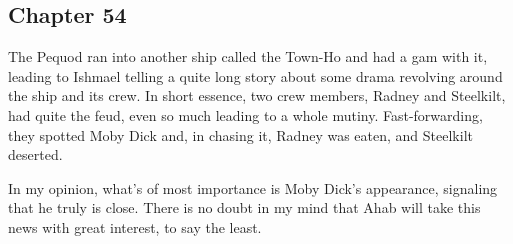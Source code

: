 \subsection{Chapter 54}

The Pequod ran into another ship called the Town-Ho and had a gam with it,
leading to Ishmael telling a quite long story about some drama revolving around
the ship and its crew. In short essence, two crew members, Radney and
Steelkilt, had quite the feud, even so much leading to a whole mutiny.
Fast-forwarding, they spotted Moby Dick and, in chasing it, Radney was eaten,
and Steelkilt deserted.

In my opinion, what's of most importance is Moby Dick's appearance, signaling
that he truly is close. There is no doubt in my mind that Ahab will take this
news with great interest, to say the least.
